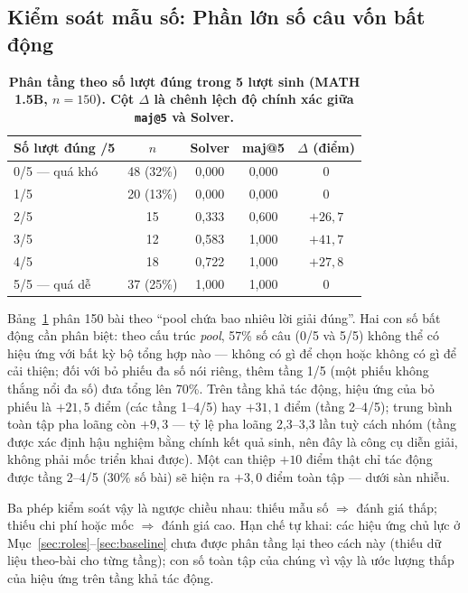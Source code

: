\documentclass[12pt,a4paper]{article}
\begin{document}
\subsection{Kiểm soát mẫu số: Phần lớn số câu vốn bất động}\label{sec:denominator}

\begin{table}[h]\centering\small
\begin{tabular}{@{}l c c c c@{}}
\toprule
Số lượt đúng /5 & \(n\) & Solver & maj@5 & \(\Delta\) (điểm)\\
\midrule
0/5 --- quá khó & 48 (32\%) & 0,000 & 0,000 & 0\\
1/5 & 20 (13\%) & 0,000 & 0,000 & 0\\
2/5 & 15 & 0,333 & 0,600 & \(+26{,}7\)\\
3/5 & 12 & 0,583 & 1,000 & \(+41{,}7\)\\
4/5 & 18 & 0,722 & 1,000 & \(+27{,}8\)\\
5/5 --- quá dễ & 37 (25\%) & 1,000 & 1,000 & 0\\
\bottomrule
\end{tabular}
\caption{\textbf{Phân tầng theo số lượt đúng trong 5 lượt sinh (MATH 1.5B, \(n=150\)). Cột \(\Delta\) là chênh lệch độ chính xác giữa \texttt{maj@5} và Solver.}}
\label{tab:strata}
\end{table}

Bảng~\ref{tab:strata} phân 150 bài theo ``pool chứa bao nhiêu lời giải đúng''. Hai con số bất động cần phân biệt: theo cấu trúc \textit{pool}, 57\% số câu (0/5 và 5/5) không thể có hiệu ứng với bất kỳ bộ tổng hợp nào --- không có gì để chọn hoặc không có gì để cải thiện; đối với bỏ phiếu đa số nói riêng, thêm tầng 1/5 (một phiếu không thắng nổi đa số) đưa tổng lên 70\%. Trên tầng khả tác động, hiệu ứng của bỏ phiếu là \(+21{,}5\) điểm (các tầng 1--4/5) hay \(+31{,}1\) điểm (tầng 2--4/5); trung bình toàn tập pha loãng còn \(+9{,}3\) --- tỷ lệ pha loãng 2,3--3,3 lần tuỳ cách nhóm (tầng được xác định hậu nghiệm bằng chính kết quả sinh, nên đây là công cụ diễn giải, không phải mốc triển khai được). Một can thiệp \(+10\) điểm thật chỉ tác động được tầng 2--4/5 (30\% số bài) sẽ hiện ra \(+3{,}0\) điểm toàn tập --- dưới sàn nhiễu.

Ba phép kiểm soát vậy là ngược chiều nhau: thiếu mẫu số \(\Rightarrow\) đánh giá thấp; thiếu chi phí hoặc mốc \(\Rightarrow\) đánh giá cao. Hạn chế tự khai: các hiệu ứng chủ lực ở Mục~\ref{sec:roles}--\ref{sec:baseline} chưa được phân tầng lại theo cách này (thiếu dữ liệu theo-bài cho từng tầng); con số toàn tập của chúng vì vậy là ước lượng thấp của hiệu ứng trên tầng khả tác động.
\end{document}
